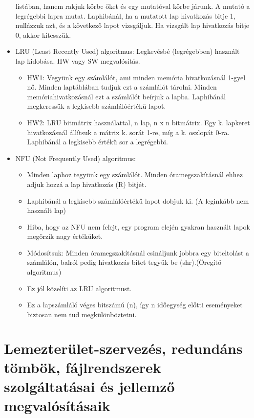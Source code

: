 \documentclass[margin=0px]{article}
\begin{document}
\begin{itemize}
          listában, hanem rakjuk körbe őket és egy mutatóval körbe járunk. A mutató a legrégebbi lapra mutat. Laphibánál, ha a mutatott lap hivatkozás bitje 1, nullázzuk azt, és a következő lapot
          vizsgáljuk. Ha vizsgált lap hivatkozás bitje 0, akkor kitesszük.
    \item LRU (Least Recently Used) algoritmus: Legkevésbé (legrégebben) használt lap kidobása. HW vagy SW megvalósítás.
          \begin{itemize}
              \item HW1: Vegyünk egy számlálót, ami minden memória hivatkozásnál 1-gyel nő. Minden laptáblában tudjuk ezt a számlálót tárolni. Minden memóriahivatkozásnál ezt a számlálót beírjuk a lapba. Laphibánál megkeressük a legkisebb számlálóértékű lapot.
              \item HW2: LRU bitmátrix használattal, n lap, n x n bitmátrix. Egy k. lapkeret hivatkozásnál állítsuk a mátrix k. sorát 1-re, míg a k. oszlopát 0-ra. Laphibánál a legkisebb értékű sor a legrégebbi.
          \end{itemize}
    \item NFU (Not Frequently Used) algoritmus:
          \begin{itemize}
              \item Minden laphoz tegyünk egy számlálót. Minden óramegszakításnál ehhez adjuk hozzá a lap
                    hivatkozás (R) bitjét.
              \item Laphibánál a legkisebb számlálóértékű lapot dobjuk ki. (A leginkább nem használt lap)
              \item Hiba, hogy az NFU nem felejt, egy program elején gyakran használt lapok megőrzik nagy értéküket.
              \item Módosítsuk: Minden óramegszakításnál csináljunk jobbra egy biteltolást a számlálón, balról pedig hivatkozás bitet tegyük be (shr).(Öregítő algoritmus)
              \item Ez jól közelíti az LRU algoritmust.
              \item Ez a lapszámláló véges bitszámú (n), így n időegység előtti eseményeket biztosan nem tud megkülönböztetni.
          \end{itemize}
\end{itemize}

\section{Lemezterület-szervezés, redundáns tömbök, fájlrendszerek szolgáltatásai és jellemző megvalósításaik}
\end{document}
